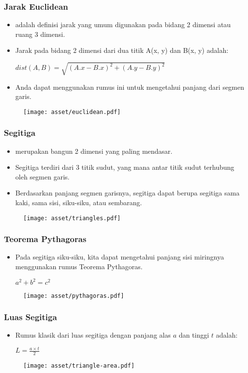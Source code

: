 \begin{frame}
\frametitle{Jarak Euclidean}
\begin{itemize}
  \item {} adalah definisi jarak yang umum digunakan pada bidang 2 dimensi atau ruang 3 dimensi.
  \item Jarak pada bidang 2 dimensi dari dua titik A(x, y) dan B(x, y) adalah:

  \(dist(A, B) = \sqrt{(A.x - B.x)^2 + (A.y - B.y)^2} \)
  \item Anda dapat menggunakan rumus ini untuk mengetahui panjang dari segmen garis.
\end{itemize}
\begin{figure}
  \texttt{[image: asset/euclidean.pdf]}
\end{figure}
\end{frame}

\begin{frame}
\frametitle{Segitiga}
\begin{itemize}
  \item {} merupakan bangun 2 dimensi yang paling mendasar.
  \item Segitiga terdiri dari 3 titik sudut, yang mana antar titik sudut terhubung oleh segmen garis.
  \item Berdasarkan panjang segmen garisnya, segitiga dapat berupa segitiga sama kaki, sama sisi, siku-siku, atau sembarang.
\end{itemize}
\begin{figure}
  \texttt{[image: asset/triangles.pdf]}
\end{figure}
\end{frame}

\begin{frame}
\frametitle{Teorema Pythagoras}
\begin{itemize}
  \item Pada segitiga siku-siku, kita dapat mengetahui panjang sisi miringnya menggunakan rumus Teorema Pythagoras.
  
  \(a^2 + b^2 = c^2\)
\end{itemize}
\begin{figure}
  \texttt{[image: asset/pythagoras.pdf]}
\end{figure}
\end{frame}

\begin{frame}
\frametitle{Luas Segitiga}
\begin{itemize}
  \item Rumus klasik dari luas segitiga dengan panjang alas $a$ dan tinggi $t$ adalah:\newline
  
  \(\displaystyle L = \frac{a \times t}{2}\)
\end{itemize}
\begin{figure}
  \texttt{[image: asset/triangle-area.pdf]}
\end{figure}
\end{frame}


